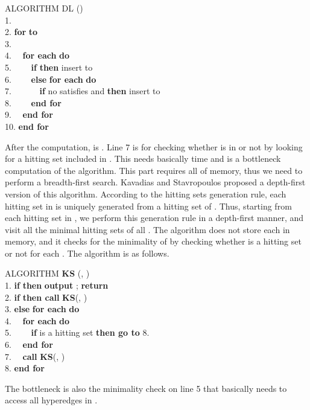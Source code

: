 \begin{tabbing}
ALGORITHM DL ()\\
1. \\
2. {\bf for}  {\bf to} \\
3. \ \ \\
4. \ \ {\bf for each}  {\bf do}\\
5. \ \ \ \ {\bf if}  {\bf then} insert  to \\
6. \ \ \ \ {\bf else} {\bf for each}  {\bf do}\\
7. \ \ \ \ \ \ {\bf if} no  satisfies  and  {\bf then} insert  to \\
8. \ \ \ \ {\bf end for}\\
9. \ \ {\bf end for}\\
10. {\bf end for}
\end{tabbing}

After the computation,  is .
Line 7 is for checking whether  is in  or not by
 looking for a hitting set included in .
This needs basically  time and is a bottleneck
 computation of the algorithm.
This part requires all of  memory, thus we need to perform a
 breadth-first search.
Kavadias and Stavropoulos\cite{KvSt99,KvSt05} proposed a depth-first version
 of this algorithm.
According to the hitting sets generation rule, each hitting set in
  is uniquely generated from a hitting set of .
Thus, starting from each hitting set in , we perform this
 generation rule in a depth-first manner, and visit all the minimal
 hitting sets of all .
The algorithm does not store each  in memory, and it checks
 for the minimality of  by checking whether  is
 a hitting set or not for each .
The algorithm is as follows.

\begin{tabbing}
ALGORITHM {\bf KS} (, )\\
1. {\bf if}  {\bf then} {\bf output} ; {\bf return}\\
2. {\bf if}  {\bf then call} {\bf KS}(, )\\
3. {\bf else} {\bf for each}  {\bf do}\\
4. \ \ {\bf for each}  {\bf do}\\
5. \ \ \ \ {\bf if}  is a hitting set {\bf then go to} 8.\\
6. \ \ {\bf end for}\\
7. \ \ {\bf call} {\bf KS}(, )\\
8. {\bf end for}
\end{tabbing}

The bottleneck is also the minimality check on line 5 that basically needs
 to access all hyperedges in .

